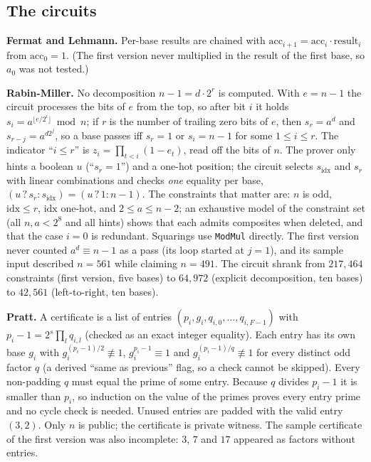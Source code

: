 \documentclass[12pt]{article}
\begin{document}
\subsection*{The circuits}

\textbf{Fermat and Lehmann.} Per-base results are chained with $\mathrm{acc}_{i+1} = \mathrm{acc}_i \cdot \mathrm{result}_i$ from $\mathrm{acc}_0 = 1$. (The first version never multiplied in the result of the first base, so $a_0$ was not tested.)

\textbf{Rabin-Miller.} No decomposition $n-1 = d\cdot 2^r$ is computed. With $e = n-1$ the circuit processes the bits of $e$ from the top, so after bit $i$ it holds $s_i = a^{\lfloor e/2^i\rfloor} \bmod n$; if $r$ is the number of trailing zero bits of $e$, then $s_r = a^d$ and $s_{r-j} = a^{d2^j}$, so a base passes iff $s_r = 1$ or $s_i = n-1$ for some $1 \le i \le r$. The indicator ``$i \le r$'' is $z_i = \prod_{t<i}(1-e_t)$, read off the bits of $n$. The prover only hints a boolean $u$ (``$s_r = 1$'') and a one-hot position; the circuit selects $s_{\mathrm{idx}}$ and $s_r$ with linear combinations and checks \emph{one} equality per base, $(u\,?\,s_r : s_{\mathrm{idx}}) = (u\,?\,1 : n-1)$. The constraints that matter are: $n$ is odd, $\mathrm{idx}\le r$, $\mathrm{idx}$ one-hot, and $2 \le a \le n-2$; an exhaustive model of the constraint set (all $n,a<2^8$ and all hints) shows that each admits composites when deleted, and that the case $i=0$ is redundant. Squarings use \texttt{ModMul} directly. The first version never counted $a^d \equiv n-1$ as a pass (its loop started at $j=1$), and its sample input described $n = 561$ while claiming $n = 491$. The circuit shrank from $217{,}464$ constraints (first version, five bases) to $64{,}972$ (explicit decomposition, ten bases) to $42{,}561$ (left-to-right, ten bases).

\textbf{Pratt.} A certificate is a list of entries $(p_i, g_i, q_{i,0},\dots,q_{i,F-1})$ with $p_i - 1 = 2^s \prod_l q_{i,l}$ (checked as an exact integer equality). Each entry has its own base $g_i$ with $g_i^{(p_i-1)/2} \not\equiv 1$, $g_i^{p_i-1} \equiv 1$ and $g_i^{(p_i-1)/q}\not\equiv 1$ for every distinct odd factor $q$ (a derived ``same as previous'' flag, so a check cannot be skipped). Every non-padding $q$ must equal the prime of some entry. Because $q$ divides $p_i - 1$ it is smaller than $p_i$, so induction on the value of the primes proves every entry prime and no cycle check is needed. Unused entries are padded with the valid entry $(3, 2)$. Only $n$ is public; the certificate is private witness. The sample certificate of the first version was also incomplete: $3$, $7$ and $17$ appeared as factors without entries.
\end{document}

